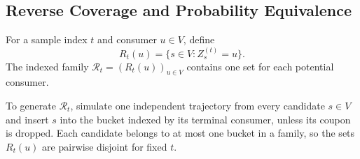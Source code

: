 \documentclass[sigconf]{acmart}
\begin{document}
\subsection{Reverse Coverage and Probability Equivalence}
\label{sec:reverse-coverage}

\begin{definition}
For a sample index $t$ and consumer $u\in V$, define
\begin{equation}
\label{eq:reverse-set-def}
  R_t(u)=\{s\in V:Z_s^{(t)}=u\}.
\end{equation}
The indexed family $\mathcal R_t=(R_t(u))_{u\in V}$ contains one
set for each potential consumer.
\end{definition}

To generate $\mathcal R_t$, simulate one independent trajectory
from every candidate $s\in V$ and insert $s$ into the bucket
indexed by its terminal consumer, unless its coupon is dropped.
Each candidate belongs to at most one bucket in a family, so the
sets $R_t(u)$ are pairwise disjoint for fixed $t$.
\end{document}

